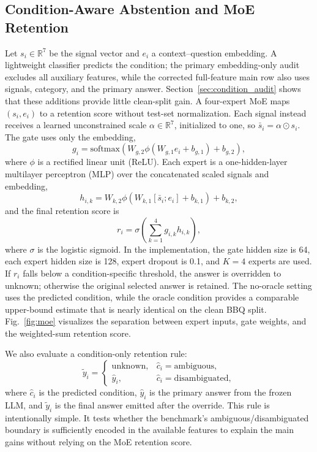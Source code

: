 \documentclass{ieeeaccess}
\begin{document}
\subsection{Condition-Aware Abstention and MoE Retention}
Let $s_i\in\mathbb{R}^7$ be the signal vector and $e_i$ a context--question embedding. A lightweight classifier predicts the condition; the primary embedding-only audit excludes all auxiliary features, while the corrected full-feature main row also uses signals, category, and the primary answer. Section~\ref{sec:condition_audit} shows that these additions provide little clean-split gain. A four-expert MoE maps $(s_i,e_i)$ to a retention score without test-set normalization. Each signal instead receives a learned unconstrained scale $\alpha\in\mathbb{R}^7$, initialized to one, so $\bar{s}_i=\alpha\odot s_i$. The gate uses only the embedding,
\begin{equation}
    g_i=\mathrm{softmax}\!\left(W_{g,2}\phi(W_{g,1}e_i+b_{g,1})+b_{g,2}\right),
\end{equation}
where $\phi$ is a rectified linear unit (ReLU). Each expert is a one-hidden-layer multilayer perceptron (MLP) over the concatenated scaled signals and embedding,
\begin{equation}
    h_{i,k}=W_{k,2}\phi(W_{k,1}[\bar{s}_i;e_i]+b_{k,1})+b_{k,2},
\end{equation}
and the final retention score is
\begin{equation}
    r_i=\sigma\!\left(\sum_{k=1}^{4}g_{i,k}h_{i,k}\right),
\end{equation}
where $\sigma$ is the logistic sigmoid. In the implementation, the gate hidden size is 64, each expert hidden size is 128, expert dropout is 0.1, and $K=4$ experts are used. If $r_i$ falls below a condition-specific threshold, the answer is overridden to unknown; otherwise the original selected answer is retained. The no-oracle setting uses the predicted condition, while the oracle condition provides a comparable upper-bound estimate that is nearly identical on the clean BBQ split. Fig.~\ref{fig:moe} visualizes the separation between expert inputs, gate weights, and the weighted-sum retention score.

We also evaluate a condition-only retention rule:
\begin{equation}
    \tilde{y}_i =
    \begin{cases}
    \mathrm{unknown}, & \hat{c}_i=\mathrm{ambiguous},\\
    \hat{y}_i, & \hat{c}_i=\mathrm{disambiguated},
    \end{cases}
\end{equation}
where $\hat{c}_i$ is the predicted condition, $\hat{y}_i$ is the primary answer from the frozen LLM, and $\tilde{y}_i$ is the final answer emitted after the override. This rule is intentionally simple. It tests whether the benchmark's ambiguous/disambiguated boundary is sufficiently encoded in the available features to explain the main gains without relying on the MoE retention score.
\end{document}
